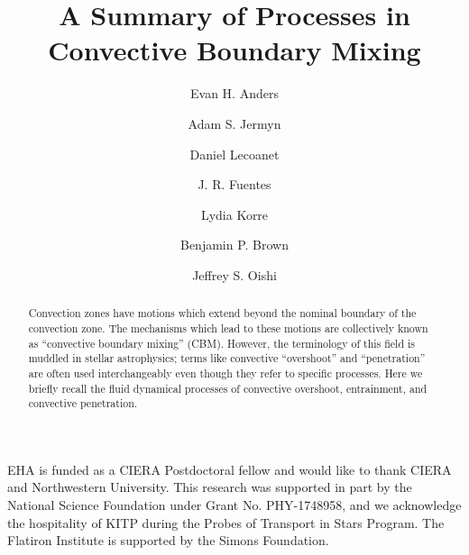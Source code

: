 \documentclass[twocolumn, linenumbers, twocolappendix]{aastex631}
\begin{document}
\title{A Summary of Processes in Convective Boundary Mixing}
\author[0000-0002-3433-4733]{Evan H. Anders}
\author[0000-0001-5048-9973]{Adam S. Jermyn}
\author[0000-0002-7635-9728]{Daniel Lecoanet}
\author[0000-0003-2124-9764]{J. R. Fuentes}
\author[0000-0002-0963-4881]{Lydia Korre}
\author[0000-0001-8935-219X]{Benjamin P. Brown}
\author[0000-0001-8531-6570]{Jeffrey S. Oishi}


\begin{abstract}
    Convection zones have motions which extend beyond the nominal boundary of the convection zone.
    The mechanisms which lead to these motions are collectively known as ``convective boundary mixing'' (CBM).
    However, the terminology of this field is muddled in stellar astrophysics; terms like convective ``overshoot'' and ``penetration'' are often used interchangeably even though they refer to specific processes.
    Here we briefly recall the fluid dynamical processes of convective overshoot, entrainment, and convective penetration.
\end{abstract}









\begin{acknowledgments}
EHA is funded as a CIERA Postdoctoral fellow and would like to thank CIERA and Northwestern University. 
This research was supported in part by the National Science Foundation under Grant No. PHY-1748958, and we acknowledge the hospitality of KITP during the Probes of Transport in Stars Program.
The Flatiron Institute is supported by the Simons Foundation.
\end{acknowledgments}




\end{document}
